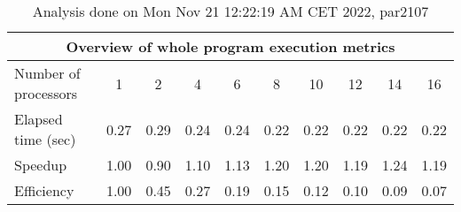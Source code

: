 \begin{table}[h]
\begin{center}
\begin{tabular}{|l|c|c|c|c|c|c|c|c|c|}
\hline
\multicolumn{10}{|c|}{Overview of whole program execution metrics} \\
\hline
\hline
Number of processors & 1 & 2 & 4 & 6 & 8 & 10 & 12 & 14 & 16 \\
\hline
Elapsed time (sec)      &       0.27 &       0.29 &       0.24 &       0.24 &       0.22 &       0.22 &       0.22 &       0.22 &       0.22 \\
\hline
Speedup                 &       1.00 &       0.90 &       1.10 &       1.13 &       1.20 &       1.20 &       1.19 &       1.24 &       1.19 \\
\hline
Efficiency              &       1.00 &       0.45 &       0.27 &       0.19 &       0.15 &       0.12 &       0.10 &       0.09 &       0.07 \\
\hline
\end{tabular}
\end{center}
\caption{ Analysis done on Mon Nov 21 12:22:19 AM CET 2022, par2107}
\end{table}
